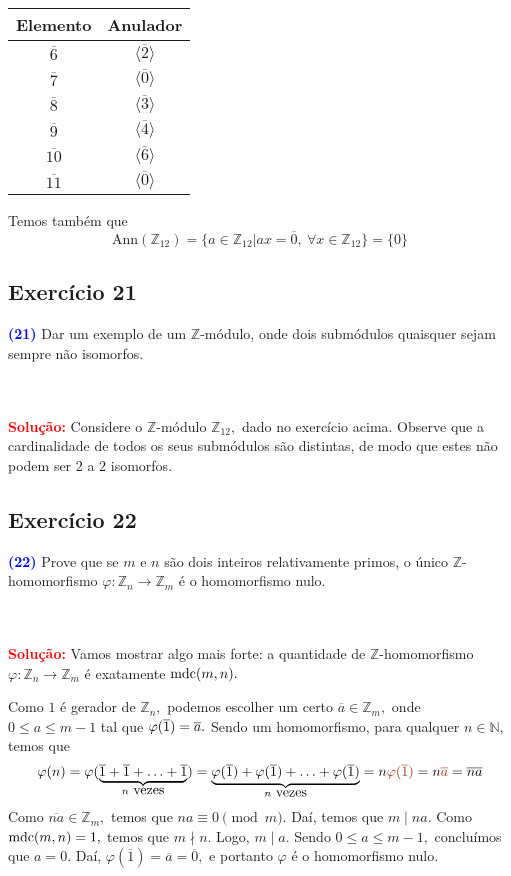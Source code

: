 \documentclass[11pt,a4paper]{article}
\newcommand{\exercicio}[1]{\subsection{Exercício #1} \textcolor{blue}{\bf(#1)}}
\newcommand{\solucao}[1]{
\textbf{\textcolor{white}{oi}\\ \\ \textcolor{red}{Solução:}} #1}
\begin{document}
{\begin{table}[h]
\begin{minipage}{.5\textwidth}
 \end{minipage} 
 \begin{minipage}{.5\textwidth}
 \centering
 \begin{tabular}{|c|c|}
 \toprule
 Elemento & Anulador \\ \hline
$\overline{6}$ & $\langle \overline{2} \rangle$ \\\hline
$\overline{7}$ & $\langle \overline{0} \rangle$ \\\hline
$\overline{8}$ & $\langle \overline{3} \rangle$ \\\hline
$\overline{9}$ & $\langle \overline{4} \rangle$ \\\hline
$\overline{10}$ & $\langle \overline{6} \rangle$ \\\hline
$\overline{11}$ & $\langle \overline{0} \rangle$ \\ \hline
 \end{tabular}
  
 \end{minipage} 
\end{table}

Temos também que
\[
\mbox{Ann}(\mathbb{Z}_{12}) = \{ a \in \mathbb{Z}_{12} | ax = \overline{0}, \ \forall x \in \mathbb{Z}_{12} \} = \{ 0 \}
\]
}
\exercicio{21} Dar um exemplo de um $\mathbb{Z}$-módulo, onde dois submódulos quaisquer sejam sempre não isomorfos.
\solucao{Considere o $\mathbb{Z}$-módulo $\mathbb{Z}_{12},$ dado no exercício acima. Observe que a cardinalidade de todos os seus submódulos são distintas, de modo que estes não podem ser $2$ a $2$ isomorfos.}
\exercicio{22} Prove que se $m$ e $n$ são dois inteiros relativamente primos, o único $\mathbb{Z}$-homomorfismo $\varphi \colon \mathbb{Z}_n \to \mathbb{Z}_m$ é
o homomorfismo nulo.
\solucao{
Vamos mostrar algo mais forte: a quantidade de $\mathbb{Z}$-homomorfismo $\varphi \colon \mathbb{Z}_n \to \mathbb{Z}_m$ é exatamente ${\rm mdc}(m,n).$ 

Como $1$ é gerador de $\mathbb{Z}_n,$ podemos escolher um certo $\overline{a} \in \mathbb{Z}_m,$ onde $0 \le a \le m-1$ tal que $\varphi(\overline{1}) = \overline{a}.$ Sendo um homomorfismo, para qualquer $n \in \mathbb{N},$ temos que
\[
\varphi(n) = \varphi(\underbrace{\ovelrine{1} + \ovelrine{1} + \ldots + \ovelrine{1}}_{n \mbox{ vezes}}) = \underbrace{\varphi(\ovelrine{1}) + \varphi(\ovelrine{1}) + \ldots + \varphi(\ovelrine{1})}_{n \mbox{ vezes}} =n \textcolor{RawSienna}{\varphi(\overline{1})} =n \textcolor{RawSienna}{\overline{a}} = \overline{na}
\]
Como $\overline{na} \in \mathbb{Z}_m,$ temos que $na \equiv 0 \pmod m.$ Daí, temos que $m \mid na.$ Como ${\rm mdc}(m,n) = 1,$ temos que $m \nmid n.$ Logo, $m \mid a.$ Sendo $0 \le a \le m-1,$ concluímos que $a = 0.$ Daí, $\varphi(\overline{1}) = \overline{a} = \overline{0},$ e portanto $\varphi$ é o homomorfismo nulo.





}
\end{document}
